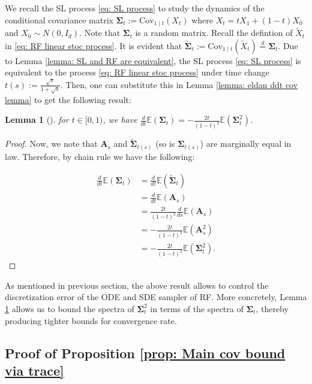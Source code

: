 \documentclass{article}
\theoremstyle{plain}
\newtheorem{lemma}[theorem]{Lemma}
\theoremstyle{definition}
\theoremstyle{remark}
\def\bA{\mathbf{A}}
\def\bbE{\mathbb{E}}
\def\bSigma{{\boldsymbol\Sigma}}
\def\Cov{\text{Cov}}
\begin{document}
We recall the SL process \eqref{eq: SL process} to study the dynamics of the conditional covariance matrix $ \bSigma_t := \Cov_{1 \mid t}(X_t)$ where $X_t = t X_1 + (1-t)X_0$ and $X_0 \sim N(0, I_d)$. Note that $\bSigma_t$ is a random matrix. Recall the defintion of $\tilde X_t$ in \eqref{eq: RF linear stoc process}. It is evident that $\tilde \bSigma_t:= \Cov_{1 \mid t}(\tilde X_t) \overset{d}{=}\bSigma_t  $. Due to Lemma  \ref{lemma: SL and RF are equivalent}, the SL process \eqref{eq: SL process} is equivalent to the process \eqref{eq: RF linear stoc process} under time change $t(s):= \frac{\sqrt{s}}{1 + \sqrt{s}}$. Then, one can substitute this in Lemma \ref{lemma: eldan ddt cov lemma} to get the following result:
\begin{lemma}[]
    \label{lemma: RF ddt cov lemma}
    for $t \in [0,1)$, we have $\frac{d}{dt} \bbE (\bSigma_t) = - \frac{2t}{(1-t)^3} \bbE(\bSigma_t^2)$.
\end{lemma}
\begin{proof}
    Now, we note that $\bA_s$ and $\tilde \bSigma_{t(s)}$ (so is $\bSigma_{t(s)}$) are marginally equal in law. Therefore, by chain rule we have the following:

\begin{align*}
    \frac{d}{dt} \bbE(\bSigma_t) & = \frac{d}{dt} \bbE(\tilde \bSigma_t)\\
    &= \frac{d}{dt} \bbE (\bA_s)\\
    & = \frac{2t}{(1-t)^3} \frac{d}{ds} \bbE (\bA_s)\\
    & = - \frac{2t}{(1-t)^3} \bbE(\bA_s^2)\\
    & = - \frac{2t}{(1-t)^3} \bbE(\bSigma_t^2).
\end{align*}
\end{proof}
As mentioned in previous section, the above result allows to control the discretization error of the ODE and SDE sampler of RF. More concretely, Lemma \ref{lemma: RF ddt cov lemma} allows us to bound the spectra of $\bSigma_t^2$ in terms of the spectra of $\bSigma_t$, thereby producing tighter bounds for convergence rate.



\subsection{Proof of Proposition \ref{prop: Main cov bound via trace}}
\label{app: proof of Cov Frobenius bound}
\end{document}
